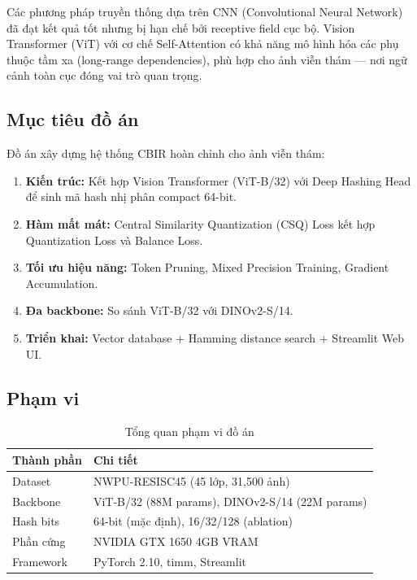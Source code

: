 \documentclass[13pt,a4paper]{article}
\begin{document}
Các phương pháp truyền thống dựa trên CNN (Convolutional Neural Network) đã đạt kết quả tốt nhưng bị hạn chế bởi receptive field cục bộ. Vision Transformer (ViT) với cơ chế Self-Attention có khả năng mô hình hóa các phụ thuộc tầm xa (long-range dependencies), phù hợp cho ảnh viễn thám --- nơi ngữ cảnh toàn cục đóng vai trò quan trọng.

\subsection{Mục tiêu đồ án}

Đồ án xây dựng hệ thống CBIR hoàn chỉnh cho ảnh viễn thám:

\begin{enumerate}
    \item \textbf{Kiến trúc:} Kết hợp Vision Transformer (ViT-B/32) với Deep Hashing Head để sinh mã hash nhị phân compact 64-bit.
    \item \textbf{Hàm mất mát:} Central Similarity Quantization (CSQ) Loss kết hợp Quantization Loss và Balance Loss.
    \item \textbf{Tối ưu hiệu năng:} Token Pruning, Mixed Precision Training, Gradient Accumulation.
    \item \textbf{Đa backbone:} So sánh ViT-B/32 với DINOv2-S/14.
    \item \textbf{Triển khai:} Vector database + Hamming distance search + Streamlit Web UI.
\end{enumerate}

\subsection{Phạm vi}

\begin{table}[H]
\centering
\caption{Tổng quan phạm vi đồ án}
\label{tab:scope}
\begin{tabular}{ll}
\toprule
\textbf{Thành phần} & \textbf{Chi tiết} \\
\midrule
Dataset       & NWPU-RESISC45 (45 lớp, 31{,}500 ảnh) \\
Backbone      & ViT-B/32 (88M params), DINOv2-S/14 (22M params) \\
Hash bits     & 64-bit (mặc định), 16/32/128 (ablation) \\
Phần cứng     & NVIDIA GTX 1650 4GB VRAM \\
Framework     & PyTorch 2.10, timm, Streamlit \\
\bottomrule
\end{tabular}
\end{table}
\end{document}
